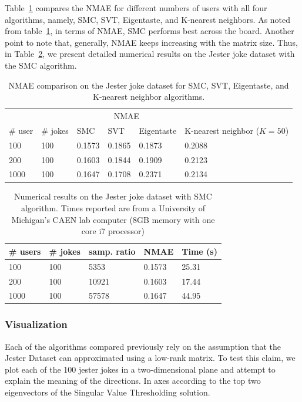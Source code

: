 \documentclass{article} %
\newcommand{\mc}[2]{\multicolumn{#1}{#2}}
\begin{document}
Table~\ref{Compare} compares the NMAE for different numbers of users
with all four algorithms, namely, SMC, SVT, Eigentaste, and K-nearest
neighbors. As noted from table~\ref{Compare}, in terms of NMAE, SMC
performs best across the board. Another point to note that, generally,
NMAE keeps increasing with the matrix size. Thus, in Table~\ref{SMC},
we present detailed numerical results on the Jester joke dataset with
the SMC algorithm.

\begin{table} [h]
\centering
\caption{NMAE comparison on the Jester joke dataset for SMC, SVT, Eigentaste, and K-nearest neighbor algorithms.}
 \begin{tabular}{l l | l l l l}%
  \hline \hline
   & & \mc{3}{c}{NMAE}\\
  \# user & \# jokes & SMC  & SVT & Eigentaste & K-nearest neighbor ($K=50$)\\
\hline
100 & 100 & 0.1573 & 0.1865 &0.1873 & 0.2088\\
200 & 100 & 0.1603 & 0.1844 & 0.1909 & 0.2123\\
1000 & 100 & 0.1647& 0.1708 & 0.2371 & 0.2134\\
\hline \hline
\end{tabular}
\label{Compare} 
\end{table}

\begin{table} [h]
\centering
 \caption{Numerical results on the Jester joke dataset with SMC
   algorithm. Times reported are from a University of Michigan's CAEN
   lab computer (8GB memory with one core i7 processor)}
 \begin{tabular}{l l l l l}%
   \hline \hline
   \# users & \# jokes & samp. ratio & NMAE & Time (s)\\
   \hline
   100 & 100 & 5353 & 0.1573 & 25.31\\
   200 & 100 & 10921 & 0.1603 & 17.44\\
   1000 & 100 & 57578 & 0.1647 & 44.95\\
   \hline \hline
 \end{tabular}

\label{SMC}
\end{table}

\subsubsection{Visualization}

Each of the algorithms compared previously rely on the assumption that
the Jester Dataset can approximated using a low-rank matrix. To test
this claim, we plot each of the 100 jester jokes in a two-dimensional
plane and attempt to explain the meaning of the directions. In axes
according to the top two eigenvectors of the Singular Value
Thresholding solution.
\end{document}
